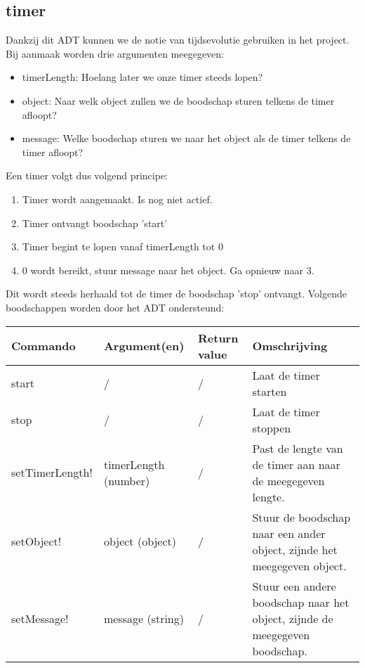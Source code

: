 \documentclass{article}
\begin{document}
\subsection{timer} %
Dankzij dit ADT kunnen we de notie van tijdsevolutie gebruiken in het project. Bij aanmaak worden drie argumenten meegegeven:
\begin{itemize}
  \item timerLength: Hoelang later we onze timer steeds lopen?
  \item object: Naar welk object zullen we de boodschap sturen telkens de timer afloopt?
  \item message: Welke boodschap sturen we naar het object als de timer telkens de timer afloopt?
\end{itemize}
Een timer volgt dus volgend principe:
\begin{enumerate}
  \item Timer wordt aangemaakt. Is nog niet actief.
  \item Timer ontvangt boodschap 'start'
  \item Timer begint te lopen vanaf timerLength tot 0
  \item 0 wordt bereikt, stuur message naar het object. Ga opnieuw naar 3.
\end{enumerate}
Dit wordt steeds herhaald tot de timer de boodschap 'stop' ontvangt. Volgende boodschappen worden door het ADT ondersteund:
\begin{center}
    \begin{tabular}{ | l | l | l | p{8cm} |}
    \hline
    Commando & Argument(en) & Return value & Omschrijving \\ \hline
    start & / & / & Laat de timer starten \\ \hline
    stop & / & / & Laat de timer stoppen \\ \hline
    setTimerLength! & timerLength (number) & / & Past de lengte van de timer aan naar de meegegeven lengte. \\ \hline
    setObject! & object (object) & / & Stuur de boodschap naar een ander object, zijnde het meegegeven object. \\ \hline
    setMessage! & message (string) & / & Stuur een andere boodschap naar het object, zijnde de meegegeven boodschap. \\ \hline
    \end{tabular}
\end{center}
\end{document}
